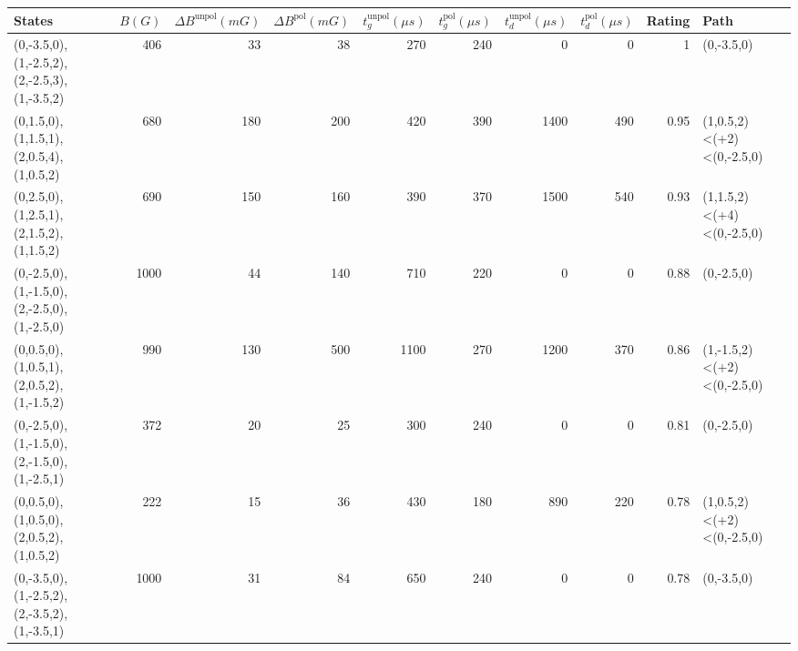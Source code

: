 \begin{tabular}{lrrrrrrrrl}
\hline
 {States}                                    &   {$B(G)$} &   {$\Delta B^{\text{unpol}}(mG)$} &   {$\Delta B^{\text{pol}}(mG)$} &   {$t^{\text{unpol}}_{g}(\mu s)$} &   {$t^{\text{pol}}_{g}(\mu s)$} &   {$t^{\text{unpol}}_{d}(\mu s)$} &   {$t^{\text{pol}}_{d}(\mu s)$} &   {Rating} & {Path}                     \\
\hline
 (0,-3.5,0),(1,-2.5,2),(2,-2.5,3),(1,-3.5,2) &        406 &                                33 &                              38 &                               270 &                             240 &                                 0 &                               0 &       1    & (0,-3.5,0)                 \\
 (0,1.5,0),(1,1.5,1),(2,0.5,4),(1,0.5,2)     &        680 &                               180 &                             200 &                               420 &                             390 &                              1400 &                             490 &       0.95 & (1,0.5,2)<(+2)<(0,-2.5,0)  \\
 (0,2.5,0),(1,2.5,1),(2,1.5,2),(1,1.5,2)     &        690 &                               150 &                             160 &                               390 &                             370 &                              1500 &                             540 &       0.93 & (1,1.5,2)<(+4)<(0,-2.5,0)  \\
 (0,-2.5,0),(1,-1.5,0),(2,-2.5,0),(1,-2.5,0) &       1000 &                                44 &                             140 &                               710 &                             220 &                                 0 &                               0 &       0.88 & (0,-2.5,0)                 \\
 (0,0.5,0),(1,0.5,1),(2,0.5,2),(1,-1.5,2)    &        990 &                               130 &                             500 &                              1100 &                             270 &                              1200 &                             370 &       0.86 & (1,-1.5,2)<(+2)<(0,-2.5,0) \\
 (0,-2.5,0),(1,-1.5,0),(2,-1.5,0),(1,-2.5,1) &        372 &                                20 &                              25 &                               300 &                             240 &                                 0 &                               0 &       0.81 & (0,-2.5,0)                 \\
 (0,0.5,0),(1,0.5,0),(2,0.5,2),(1,0.5,2)     &        222 &                                15 &                              36 &                               430 &                             180 &                               890 &                             220 &       0.78 & (1,0.5,2)<(+2)<(0,-2.5,0)  \\
 (0,-3.5,0),(1,-2.5,2),(2,-3.5,2),(1,-3.5,1) &       1000 &                                31 &                              84 &                               650 &                             240 &                                 0 &                               0 &       0.78 & (0,-3.5,0)                 \\
\hline
\end{tabular}